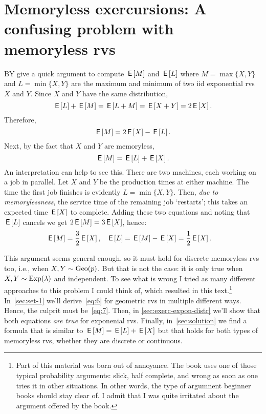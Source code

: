 


\section{Memoryless exercursions: A confusing problem with memoryless rvs}
\label{sec:memoryl-exerc-conf}
BY give a quick argument to compute $\,\mathsf{E}\left[M\right]$ and $\,\mathsf{E}\left[L\right]$ where
$M=\max\{X,Y\}$  and $L=\min\{X,Y\}$ are the maximum and minimum of two iid exponential rvs $X$ and $Y$.
Since  $X$ and $Y$  have the same distribution,
\begin{equation*}
\,\mathsf{E}\left[L\right] + \,\mathsf{E}\left[M\right] = \,\mathsf{E}\left[L+M\right]=\,\mathsf{E}\left[X+Y\right] = 2\,\mathsf{E}\left[X\right].
\end{equation*}
Therefore,
\begin{equation}
  \label{eq:6}
\,\mathsf{E}\left[M\right] = 2\,\mathsf{E}\left[X\right] - \,\mathsf{E}\left[L\right].
\end{equation}
Next, by the fact that  $X$ and $Y$ are memoryless,
\begin{equation}
  \label{eq:7}
\,\mathsf{E}\left[M\right] = \,\mathsf{E}\left[L\right]  + \,\mathsf{E}\left[X\right].
\end{equation}
An interpretation can help to see this. There are two machines, each working on a job in parallel.
Let $X$ and $Y$ be the production times at either machine.
The time the first job finishes is evidently $L=\min\{X, Y\}$.
Then, \emph{due to memorylessness}, the service time of the remaining job `restarts'; this takes an expected time $\,\mathsf{E}\left[X\right]$ to complete.
Adding these two equations and noting that $\,\mathsf{E}\left[L\right]$ cancels we get $2\,\mathsf{E}\left[M\right] = 3 \,\mathsf{E}\left[X\right] $, hence:
\begin{align}
\,\mathsf{E}\left[M\right] &= \frac 3 2 \,\mathsf{E}\left[X\right], & \,\mathsf{E}\left[L\right] &= \,\mathsf{E}\left[M\right] - \,\mathsf{E}\left[X\right] = \frac 1 2 \,\mathsf{E}\left[X\right]. \label{eq:35}
\end{align}

This argument seems general enough, so it must hold for discrete memoryless rvs too, i.e., when $X, Y \sim \mathrm{Geo}(p)$. But that is not the case: it is only true when $X, Y \sim \mathrm{Exp}(\lambda)$ and independent. To see what is wrong I tried as many different approaches to this problem I could think of, which  resulted in this text.\footnote{Part of this material was born out of annoyance.  The  book uses one of those typical probability arguments:  slick, half complete, and wrong as soon as one tries it in other situations. In other words, the type of argumnent beginner books should stay clear of. I admit that I was quite irritated about the argument offered by the book.} In~\cref{sec:set-1} we'll derive~\cref{eq:6}  for geometric rvs in multiple  different ways.
Hence, the culprit must be~\cref{eq:7}. Then, in \cref{sec:exerc-expon-distr} we'll show that both equations \emph{are true} for exponenial rvs.
Finally, in~\cref{sec:solution} we find a formula that is similar to $\,\mathsf{E}\left[M\right] = \,\mathsf{E}\left[L\right] + \,\mathsf{E}\left[X\right]$ but that holds for both types of memoryless rvs, whether they are discrete or continuous.

